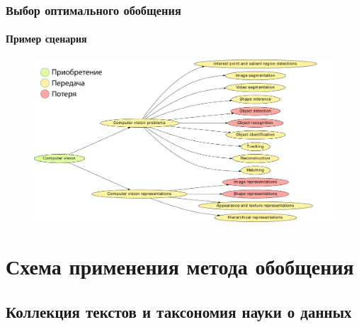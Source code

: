 \documentclass[aspectratio=169]{beamer}
\begin{document}
\begin{frame}
\frametitle{Выбор оптимального обобщения}
\framesubtitle{Пример сценария}
\begin{figure}
	\centering
	\includegraphics[width=0.9\linewidth, clip]{images/scenario_example}
\end{figure}
\end{frame}

\section{Схема применения метода обобщения}

\subsection{Коллекция текстов и таксономия науки о данных}
\end{document}
